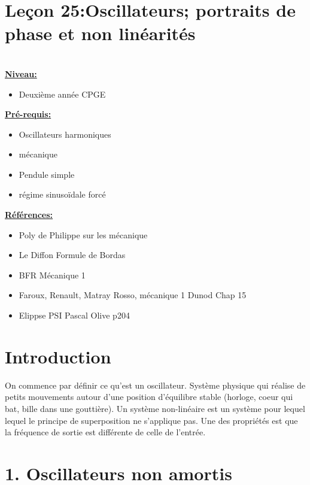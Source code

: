\documentclass[french, a4paper, 10pt, twocolumn, landscape]{article}
\begin{document}
\section*{Leçon 25:Oscillateurs; portraits de phase et non linéarités}

\hrulefill\\

\noindent\underline{\textbf{Niveau:}} 
\begin{itemize}
    \item Deuxième année CPGE
\end{itemize}

\noindent\underline{\textbf{Pré-requis:}}
\begin{itemize}
    \item Oscillateurs harmoniques
    \item mécanique
    \item Pendule simple
    \item régime sinusoïdale forcé
\end{itemize}

\noindent\underline{\textbf{Références:}}

\begin{itemize}
    \item Poly de Philippe sur les mécanique
    \item Le Diffon Formule de Bordas
    \item BFR Mécanique 1 
    \item Faroux, Renault, Matray Rosso, mécanique 1 Dunod Chap 15
    \item Elippse PSI Pascal Olive p204
\end{itemize}

\hrulefill


\section*{Introduction}

On commence par définir ce qu'est un oscillateur. Système physique qui réalise de petits mouvements autour d'une position d'équilibre stable (horloge, coeur qui bat, bille dans une gouttière). Un système non-linéaire est un système pour lequel lequel le principe de superposition ne s'applique pas. Une des propriétés est que la fréquence de sortie est différente de celle de l'entrée.

\section*{1. Oscillateurs non amortis}
\end{document}

